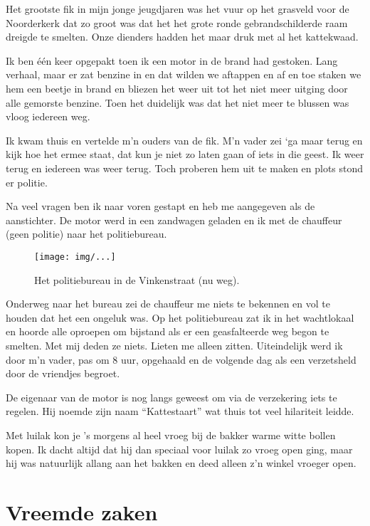 \documentclass[10pt,twoside,openright]{memoir}
\begin{document}
Het grootste fik in mijn jonge jeugdjaren was het vuur op het grasveld voor de Noorderkerk dat zo groot was dat het het grote ronde gebrandschilderde raam dreigde te smelten. Onze dienders hadden het maar druk met al het kattekwaad. 

Ik ben één keer opgepakt toen ik een motor in de brand had gestoken. Lang verhaal, maar er zat benzine in en dat wilden we aftappen en af en toe staken we hem een beetje in brand en bliezen het weer uit tot het niet meer uitging door alle gemorste benzine. Toen het duidelijk was dat het niet meer te blussen was vloog iedereen weg. 

Ik kwam thuis en vertelde m’n ouders van de fik. M’n vader zei ‘ga maar terug en kijk hoe het ermee staat, dat kun je niet zo laten gaan of iets in die geest. Ik weer terug en iedereen was weer terug. Toch proberen hem uit te maken en plots stond er politie. 

Na veel vragen ben ik naar voren gestapt en heb me aangegeven als de aanstichter. De motor werd in een zandwagen geladen en ik met de chauffeur (geen politie) naar het politiebureau. 

\begin{figure}[t]
\texttt{[image: img/...]}
\caption{Het politiebureau in de Vinkenstraat (nu weg).}
\end{figure}

Onderweg naar het bureau zei de chauffeur me niets te bekennen en vol te houden dat het een ongeluk was. Op het politiebureau zat ik in het wachtlokaal en hoorde alle oproepen om bijstand als er een geasfalteerde weg begon te smelten. Met mij deden ze niets. Lieten me alleen zitten. Uiteindelijk werd ik door m’n vader, pas om 8 uur, opgehaald en de volgende dag als een verzetsheld door de vriendjes begroet. 

De eigenaar van de motor is nog langs geweest om via de verzekering iets te regelen. Hij noemde zijn naam “Kattestaart” wat thuis tot veel hilariteit leidde.

Met luilak kon je ’s morgens al heel vroeg bij de bakker warme witte bollen kopen. Ik dacht altijd dat hij dan speciaal voor luilak zo vroeg open ging, maar hij was natuurlijk allang aan het bakken en deed alleen z’n winkel vroeger open. 

\chapter{Vreemde zaken} %
\label{cha:vreemde_zaken}
\end{document}
